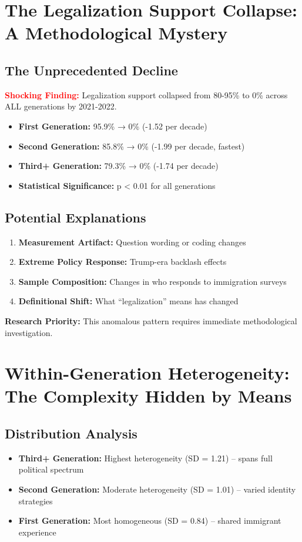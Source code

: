 \documentclass[11pt,letterpaper]{article}
\newcommand{\compactdesc}[2]{\item \textbf{#1:} #2}
\newcommand{\surprise}[1]{\textcolor{red}{\textbf{#1}}}
\begin{document}
\section{The Legalization Support Collapse: A Methodological Mystery}

\subsection{The Unprecedented Decline}
\surprise{\textbf{Shocking Finding:}} Legalization support collapsed from 80-95\% to 0\% across ALL generations by 2021-2022.

\begin{itemize}
    \compactdesc{First Generation}{95.9\% → 0\% (-1.52 per decade)}
    \compactdesc{Second Generation}{85.8\% → 0\% (-1.99 per decade, fastest)}
    \compactdesc{Third+ Generation}{79.3\% → 0\% (-1.74 per decade)}
    \compactdesc{Statistical Significance}{p < 0.01 for all generations}
\end{itemize}

\subsection{Potential Explanations}
\begin{enumerate}
    \item \textbf{Measurement Artifact:} Question wording or coding changes
    \item \textbf{Extreme Policy Response:} Trump-era backlash effects
    \item \textbf{Sample Composition:} Changes in who responds to immigration surveys
    \item \textbf{Definitional Shift:} What ``legalization'' means has changed
\end{enumerate}

\textbf{Research Priority:} This anomalous pattern requires immediate methodological investigation.

\section{Within-Generation Heterogeneity: The Complexity Hidden by Means}

\subsection{Distribution Analysis}
\begin{itemize}
    \compactdesc{Third+ Generation}{Highest heterogeneity (SD = 1.21) -- spans full political spectrum}
    \compactdesc{Second Generation}{Moderate heterogeneity (SD = 1.01) -- varied identity strategies}
    \compactdesc{First Generation}{Most homogeneous (SD = 0.84) -- shared immigrant experience}
\end{itemize}
\end{document}

